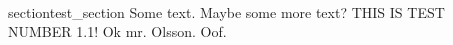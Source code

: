 \\section{test_section} Some text. Maybe some more text? THIS IS TEST NUMBER 1.1! Ok mr. Olsson. 
Oof.